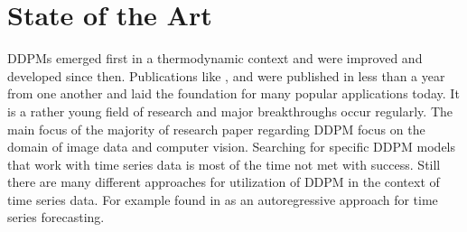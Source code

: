 \chapter{State of the Art}
\label{sec:stateoftheart}
DDPMs emerged first in a thermodynamic context \cite{sohl-dickstein_deep_2015} and were improved and developed since then. 
Publications like \cite{ho_denoising_2020}, \cite{dhariwal_diffusion_2021} and \cite{nichol_improved_2021} were published in 
less than a year from one another and laid the foundation for many popular applications today. It is a rather young field of research and 
major breakthroughs occur regularly. The main focus of the majority of research paper regarding DDPM focus on the domain of image data and computer vision.
Searching for specific DDPM models that work with time series data is most of the time not met with success. Still there are many different approaches for utilization of DDPM in the context of time series data. For example found in \cite{rasul2021autoregressive} as an autoregressive approach for time series forecasting.

